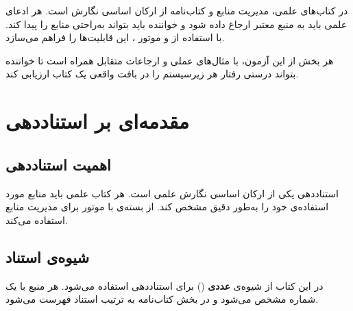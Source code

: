 \documentclass{matinbook}
\begin{document}
در کتاب‌های علمی، مدیریت منابع و کتاب‌نامه از ارکان
اساسی نگارش است. هر ادعای علمی باید به منبع معتبر
ارجاع داده شود و خواننده باید بتواند به‌راحتی منابع
را پیدا کند.  با استفاده از 
و موتور ، این قابلیت‌ها را فراهم می‌سازد.

هر بخش از این آزمون، با مثال‌های عملی و ارجاعات متقابل
همراه است تا خواننده بتواند درستی رفتار هر زیرسیستم را
در بافت واقعی یک کتاب ارزیابی کند.

\clearpage

\tableofcontents
\clearpage

\listoffigures
\clearpage

\listoftables
\clearpage

\mainmatter
\mainmattergeometry

\chapter{مقدمه‌ای بر استناددهی}
\label{chap:citation-intro}

\section{اهمیت استناددهی}
\label{sec:citation-importance}

استناددهی یکی از ارکان اساسی نگارش
علمی است. هر کتاب علمی باید منابع مورد استفاده‌ی خود
را به‌طور دقیق مشخص کند.  از بسته‌ی
 با موتور  برای مدیریت منابع
استفاده می‌کند.


\section{شیوه‌ی استناد}
\label{sec:citation-style}

در این کتاب از شیوه‌ی \textbf{عددی} () برای
استناددهی استفاده می‌شود. هر منبع با یک شماره مشخص
می‌شود و در بخش کتاب‌نامه به ترتیب استناد فهرست
می‌شود.
\end{document}
